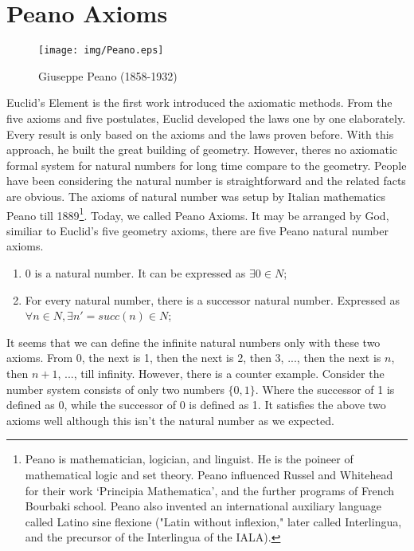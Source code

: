\documentclass[UTF8]{article}
\begin{document}
\section{Peano Axioms}

\begin{figure}[htbp]
 \centering
 \texttt{[image: img/Peano.eps]}
 \caption{Giuseppe Peano (1858-1932)}
 \label{fig:Peano}
\end{figure}

Euclid's Element is the first work introduced the axiomatic methods. From the five axioms and five postulates, Euclid developed the laws one by one elaborately. Every result is only based on the axioms and the laws proven before. With this approach, he built the great building of geometry. However, theres no axiomatic formal system for natural numbers for long time compare to the geometry. People have been considering the natural number is straightforward and the related facts are obvious. The axioms of natural number was setup by Italian mathematics Peano till 1889\footnote{Peano is mathematician, logician, and linguist. He is the poineer of mathematical logic and set theory. Peano influenced Russel and Whitehead for their work `Principia Mathematica', and the further programs of French Bourbaki school. Peano also invented an international auxiliary language called Latino sine flexione ("Latin without inflexion," later called Interlingua, and the precursor of the Interlingua of the IALA).}. Today, we called Peano Axioms. It may be arranged by God, similiar to Euclid's five geometry axioms, there are five Peano natural number axioms.

\begin{enumerate}
\item 0 is a natural number. It can be expressed as $\exists 0 \in N$;
\item For every natural number, there is a successor natural number. Expressed as $\forall n \in N, \exists n' = succ(n) \in N$;
\end{enumerate}

It seems that we can define the infinite natural numbers only with these two axioms. From 0, the next is 1, then the next is 2, then 3, ..., then the next is $n$, then $n+1$, ..., till infinity. However, there is a counter example. Consider the number system consists of only two numbers $\{0, 1\}$. Where the successor of 1 is defined as 0, while the successor of 0 is defined as 1. It satisfies the above two axioms well although this isn't the natural number as we expected.
\end{document}
